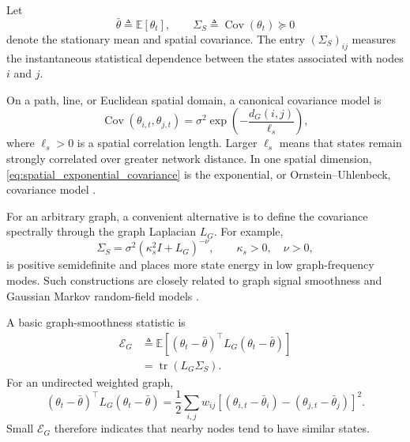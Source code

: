 \documentclass[11pt]{article}
\begin{document}
Let
\begin{equation}
    \bar{\theta}
    \triangleq
    \mathbb{E}[\theta_t],
    \qquad
    \Sigma_S
    \triangleq
    \operatorname{Cov}(\theta_t)
    \succeq 0
    \label{eq:spatial_covariance_general}
\end{equation}
denote the stationary mean and spatial covariance. The entry
$(\Sigma_S)_{ij}$ measures the instantaneous statistical dependence between
the states associated with nodes $i$ and $j$.

On a path, line, or Euclidean spatial domain, a canonical covariance model is
\begin{equation}
    \operatorname{Cov}
    \left(
        \theta_{i,t},
        \theta_{j,t}
    \right)
    =
    \sigma^2
    \exp
    \left(
        -\frac{d_G(i,j)}{\ell_s}
    \right),
    \label{eq:spatial_exponential_covariance}
\end{equation}
where $\ell_s>0$ is a spatial correlation length. Larger $\ell_s$ means that
states remain strongly correlated over greater network distance. In one
spatial dimension, \eqref{eq:spatial_exponential_covariance} is the
exponential, or Ornstein--Uhlenbeck, covariance model
\cite{williams2006gaussian}.

For an arbitrary graph, a convenient alternative is to define the covariance
spectrally through the graph Laplacian $L_G$. For example,
\begin{equation}
    \Sigma_S
    =
    \sigma^2
    \left(
        \kappa_s^2 I+L_G
    \right)^{-\nu},
    \qquad
    \kappa_s>0,\quad \nu>0,
    \label{eq:graph_spectral_covariance}
\end{equation}
is positive semidefinite and places more state energy in low graph-frequency
modes. Such constructions are closely related to graph signal smoothness and
Gaussian Markov random-field models
\cite{shuman2013emerging,lindgren2011explicit}.

A basic graph-smoothness statistic is
\begin{align}
    \mathcal{E}_G
    &\triangleq
    \mathbb{E}
    \left[
        (\theta_t-\bar{\theta})^\top
        L_G
        (\theta_t-\bar{\theta})
    \right]
    \nonumber\\
    &=
    \operatorname{tr}
    \left(
        L_G\Sigma_S
    \right).
    \label{eq:graph_smoothness}
\end{align}
For an undirected weighted graph,
\begin{equation}
    (\theta_t-\bar{\theta})^\top
    L_G
    (\theta_t-\bar{\theta})
    =
    \frac{1}{2}
    \sum_{i,j}
    w_{ij}
    \left[
        (\theta_{i,t}-\bar{\theta}_i)
        -
        (\theta_{j,t}-\bar{\theta}_j)
    \right]^2.
    \label{eq:laplacian_energy_expansion}
\end{equation}
Small $\mathcal{E}_G$ therefore indicates that nearby nodes tend to have
similar states.
\end{document}

